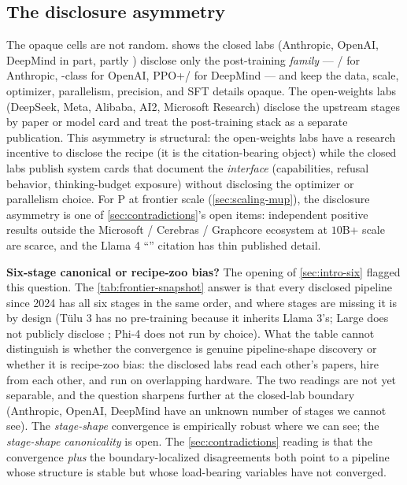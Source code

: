 \subsection{The disclosure asymmetry}
\label{sec:snap-opaque}

The opaque cells are not random.  shows
the closed labs (Anthropic, OpenAI, DeepMind in part, partly )
disclose only the post-training \emph{family} ---  /  for
Anthropic, -class for OpenAI, PPO+/ for DeepMind --- and
keep the data, scale, optimizer, parallelism, precision, and SFT
details opaque. The open-weights labs (DeepSeek, Meta, Alibaba, AI2,
Microsoft Research) disclose the upstream stages by paper or model
card and treat the post-training stack as a separate publication.
This asymmetry is structural: the open-weights labs have a research
incentive to disclose the recipe (it is the citation-bearing object)
while the closed labs publish system cards that document the
\emph{interface} (capabilities, refusal behavior, thinking-budget
exposure) without disclosing the optimizer or parallelism choice.
For \textmu P at frontier scale (\cref{sec:scaling-mup}), the
disclosure asymmetry is one of \cref{sec:contradictions}'s open
items: independent positive results outside the
Microsoft / Cerebras / Graphcore ecosystem at $10$B+ scale are
scarce, and the Llama 4 \citep{meta-llama4} ``'' citation has
thin published detail.

\begin{contradiction}
\textbf{Six-stage canonical or recipe-zoo bias?} The opening of
\cref{sec:intro-six} flagged this question. The
\cref{tab:frontier-snapshot} answer is that every disclosed pipeline
since 2024 has all six stages in the same order, and where stages
are missing it is by design (Tülu 3 has no pre-training because it
inherits Llama 3's;  Large does not publicly disclose
; Phi-4 does not run  by choice). What the table cannot
distinguish is whether the convergence is genuine pipeline-shape
discovery or whether it is recipe-zoo bias: the disclosed labs
read each other's papers, hire from each other, and run on overlapping
hardware. The two readings are not yet separable, and the question
sharpens further at the closed-lab boundary (Anthropic, OpenAI,
DeepMind have an unknown number of stages we cannot see). The
\emph{stage-shape} convergence is empirically robust where we can
see; the \emph{stage-shape canonicality} is open. The
\cref{sec:contradictions} reading is that the convergence
\emph{plus} the boundary-localized disagreements both point to a
pipeline whose structure is stable but whose load-bearing variables
have not converged.
\end{contradiction}

